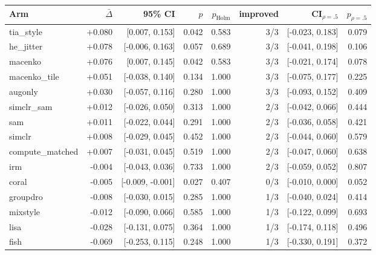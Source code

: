 \begin{tabular}{lrrrrrrr}
\toprule
Arm & $\bar\Delta$ & 95\% CI & $p$ & $p_\text{Holm}$ & improved & CI$_{\rho=.5}$ & $p_{\rho=.5}$ \\
\midrule
tia\_style & +0.080 & [0.007, 0.153] & 0.042 & 0.583 & 3/3 & [-0.023, 0.183] & 0.079 \\
he\_jitter & +0.078 & [-0.006, 0.163] & 0.057 & 0.689 & 3/3 & [-0.041, 0.198] & 0.106 \\
macenko & +0.076 & [0.007, 0.145] & 0.042 & 0.583 & 3/3 & [-0.021, 0.174] & 0.078 \\
macenko\_tile & +0.051 & [-0.038, 0.140] & 0.134 & 1.000 & 3/3 & [-0.075, 0.177] & 0.225 \\
augonly & +0.030 & [-0.057, 0.116] & 0.280 & 1.000 & 3/3 & [-0.093, 0.152] & 0.409 \\
simclr\_sam & +0.012 & [-0.026, 0.050] & 0.313 & 1.000 & 2/3 & [-0.042, 0.066] & 0.444 \\
sam & +0.011 & [-0.022, 0.044] & 0.291 & 1.000 & 2/3 & [-0.036, 0.058] & 0.421 \\
simclr & +0.008 & [-0.029, 0.045] & 0.452 & 1.000 & 2/3 & [-0.044, 0.060] & 0.579 \\
compute\_matched & +0.007 & [-0.031, 0.045] & 0.519 & 1.000 & 2/3 & [-0.047, 0.060] & 0.638 \\
irm & -0.004 & [-0.043, 0.036] & 0.733 & 1.000 & 2/3 & [-0.059, 0.052] & 0.807 \\
coral & -0.005 & [-0.009, -0.001] & 0.027 & 0.407 & 0/3 & [-0.010, 0.000] & 0.052 \\
groupdro & -0.008 & [-0.030, 0.015] & 0.285 & 1.000 & 1/3 & [-0.040, 0.024] & 0.414 \\
mixstyle & -0.012 & [-0.090, 0.066] & 0.585 & 1.000 & 1/3 & [-0.122, 0.099] & 0.693 \\
lisa & -0.028 & [-0.131, 0.075] & 0.364 & 1.000 & 1/3 & [-0.174, 0.118] & 0.496 \\
fish & -0.069 & [-0.253, 0.115] & 0.248 & 1.000 & 1/3 & [-0.330, 0.191] & 0.372 \\
\bottomrule
\end{tabular}
